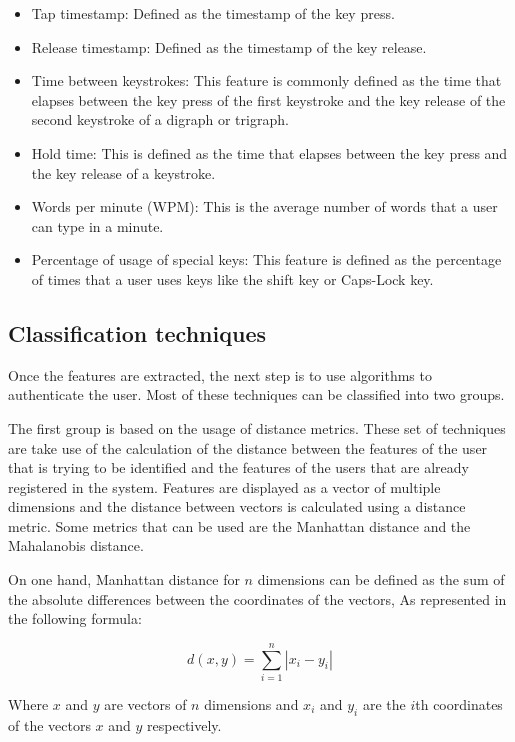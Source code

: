 \begin{itemize}
	\item Tap timestamp: Defined as the timestamp of the key press.
	\item Release timestamp: Defined as the timestamp of the key release.
	\item Time between keystrokes: This feature is commonly defined as the time that elapses between the key press of the first keystroke and the key release of the second keystroke of a digraph or trigraph.
	\item Hold time: This is defined as the time that elapses between the key press and the key release of a keystroke.
	\item Words per minute (WPM): This is the average number of words that a user can type in a minute.
	\item Percentage of usage of special keys: This feature is defined as the percentage of times that a user uses keys like the shift key or Caps-Lock key.
\end{itemize}

\subsection{Classification techniques}

Once the features are extracted, the next step is to use algorithms to authenticate the user. Most of these techniques can be classified into two groups.


The first group is based on the usage of distance metrics. These set of techniques are take use of the calculation of the distance between the features of the user that is trying to be identified and the features of the users that are already registered in the system. Features are displayed as a vector of multiple dimensions and the distance between vectors is calculated using a distance metric. Some metrics that can be used are the Manhattan distance and the Mahalanobis distance.

On one hand, Manhattan distance for $n$ dimensions can be defined as the sum of the absolute differences between the coordinates of the vectors, As represented in the following formula:

\begin{equation}
	d(x,y) = \sum_{i=1}^{n} |x_i - y_i|
\end{equation}

Where $x$ and $y$ are vectors of $n$ dimensions and $x_i$ and $y_i$ are the $i$th coordinates of the vectors $x$ and $y$ respectively.


